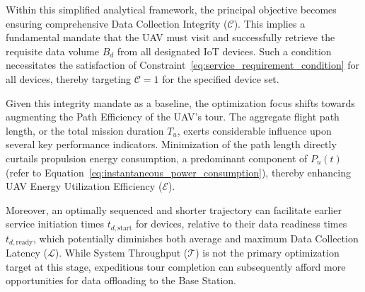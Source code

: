 \documentclass[10pt,conference,letterpaper]{IEEEtran}
\begin{document}
Within this simplified analytical framework, the principal objective becomes ensuring comprehensive Data Collection Integrity ($\mathcal{C}$). This implies a fundamental mandate that the UAV must visit and successfully retrieve the requisite data volume $B_d$ from all designated IoT devices. Such a condition necessitates the satisfaction of Constraint~\eqref{eq:service_requirement_condition} for all devices, thereby targeting $\mathcal{C}=1$ for the specified device set.

Given this integrity mandate as a baseline, the optimization focus shifts towards augmenting the Path Efficiency of the UAV's tour. The aggregate flight path length, or the total mission duration $T_u$, exerts considerable influence upon several key performance indicators. Minimization of the path length directly curtails propulsion energy consumption, a predominant component of $P_u(t)$ (refer to Equation~\eqref{eq:instantaneous_power_consumption}), thereby enhancing UAV Energy Utilization Efficiency ($\mathcal{E}$). 

Moreover, an optimally sequenced and shorter trajectory can facilitate earlier service initiation times $t_{d,\text{start}}$ for devices, relative to their data readiness times $t_{d,\text{ready}}$, which potentially diminishes both average and maximum Data Collection Latency ($\mathcal{L}$). While System Throughput ($\mathcal{T}$) is not the primary optimization target at this stage, expeditious tour completion can subsequently afford more opportunities for data offloading to the Base Station.
\end{document}
